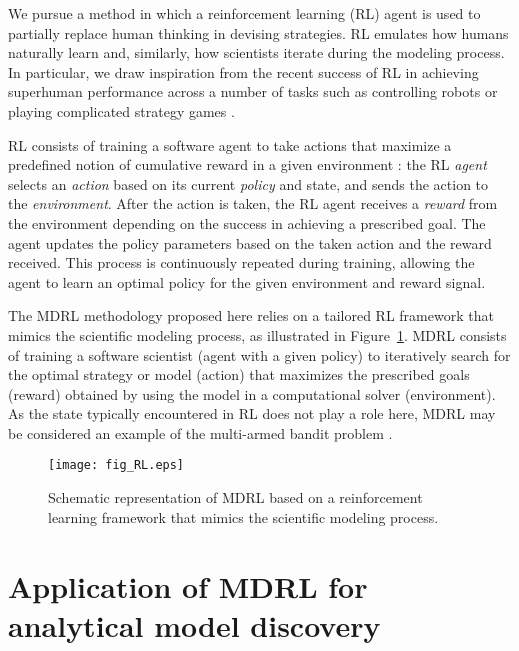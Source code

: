\documentclass{article}
\begin{document}
We pursue a method in which a reinforcement learning (RL) agent is
used to partially replace human thinking in devising strategies. RL
emulates how humans naturally learn and, similarly, how scientists
iterate during the modeling process. In particular, we draw
inspiration from the recent success of RL in achieving superhuman
performance across a number of tasks such as controlling robots
\citep{OpenAIDexterous} or playing complicated strategy games
\citep{silver2017mastering,silver2018general,alphastarblog}.

RL consists of training a software agent to take actions that maximize
a predefined notion of cumulative reward in a given environment
\citep{sutton2018reinforcement}: the RL \emph{agent} selects an
\emph{action} based on its current \emph{policy} and state, and sends
the action to the \emph{environment}. After the action is taken, the
RL agent receives a \emph{reward} from the environment depending on
the success in achieving a prescribed goal. The agent updates the
policy parameters based on the taken action and the reward
received. This process is continuously repeated during training,
allowing the agent to learn an optimal policy for the given
environment and reward signal.

The MDRL methodology proposed here relies on a tailored RL framework
that mimics the scientific modeling process, as illustrated in
Figure~\ref{fig:RL}. MDRL consists of training a software scientist
(agent with a given policy) to iteratively search for the optimal
strategy or model (action) that maximizes the prescribed goals
(reward) obtained by using the model in a computational solver
(environment). As the state typically encountered in RL does not play
a role here, MDRL may be considered an example of the multi-armed
bandit problem \citep{sutton2018reinforcement}.
\begin{figure}
    \centering
    \vspace{5px}
    \texttt{[image: fig\_RL.eps]}
    \caption{\label{fig:RL} Schematic representation of MDRL based
      on a reinforcement learning framework that mimics the scientific
      modeling process.}
\end{figure}


\section{Application of MDRL for analytical model discovery}
\label{sec:application}
\end{document}
